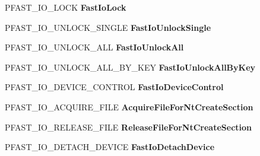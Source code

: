 \begin{DoxyCompactItemize}
\item 
\mbox{\label{struct___f_a_s_t___i_o___d_i_s_p_a_t_c_h_a94dc456d81d5b2c42f5cad09775c38d9}} 
P\+F\+A\+S\+T\+\_\+\+I\+O\+\_\+\+L\+O\+CK {\bfseries Fast\+Io\+Lock}
\item 
\mbox{\label{struct___f_a_s_t___i_o___d_i_s_p_a_t_c_h_aae46b77d058ecdfa0549a3378b7222c8}} 
P\+F\+A\+S\+T\+\_\+\+I\+O\+\_\+\+U\+N\+L\+O\+C\+K\+\_\+\+S\+I\+N\+G\+LE {\bfseries Fast\+Io\+Unlock\+Single}
\item 
\mbox{\label{struct___f_a_s_t___i_o___d_i_s_p_a_t_c_h_a3e4a90ff73783478c6253129f3346980}} 
P\+F\+A\+S\+T\+\_\+\+I\+O\+\_\+\+U\+N\+L\+O\+C\+K\+\_\+\+A\+LL {\bfseries Fast\+Io\+Unlock\+All}
\item 
\mbox{\label{struct___f_a_s_t___i_o___d_i_s_p_a_t_c_h_a17d5c9d4bb96a81815e86661032a2137}} 
P\+F\+A\+S\+T\+\_\+\+I\+O\+\_\+\+U\+N\+L\+O\+C\+K\+\_\+\+A\+L\+L\+\_\+\+B\+Y\+\_\+\+K\+EY {\bfseries Fast\+Io\+Unlock\+All\+By\+Key}
\item 
\mbox{\label{struct___f_a_s_t___i_o___d_i_s_p_a_t_c_h_a8118522780be182ccff55f62c232d223}} 
P\+F\+A\+S\+T\+\_\+\+I\+O\+\_\+\+D\+E\+V\+I\+C\+E\+\_\+\+C\+O\+N\+T\+R\+OL {\bfseries Fast\+Io\+Device\+Control}
\item 
\mbox{\label{struct___f_a_s_t___i_o___d_i_s_p_a_t_c_h_a8236b1a84a2a82d976d0c3ea2820d3d0}} 
P\+F\+A\+S\+T\+\_\+\+I\+O\+\_\+\+A\+C\+Q\+U\+I\+R\+E\+\_\+\+F\+I\+LE {\bfseries Acquire\+File\+For\+Nt\+Create\+Section}
\item 
\mbox{\label{struct___f_a_s_t___i_o___d_i_s_p_a_t_c_h_abc67021c335785597bd9a8e707b65389}} 
P\+F\+A\+S\+T\+\_\+\+I\+O\+\_\+\+R\+E\+L\+E\+A\+S\+E\+\_\+\+F\+I\+LE {\bfseries Release\+File\+For\+Nt\+Create\+Section}
\item 
\mbox{\label{struct___f_a_s_t___i_o___d_i_s_p_a_t_c_h_af4cf00fcde1beb5ca4be8c89f9aec115}} 
P\+F\+A\+S\+T\+\_\+\+I\+O\+\_\+\+D\+E\+T\+A\+C\+H\+\_\+\+D\+E\+V\+I\+CE {\bfseries Fast\+Io\+Detach\+Device}

\end{DoxyCompactItemize}
